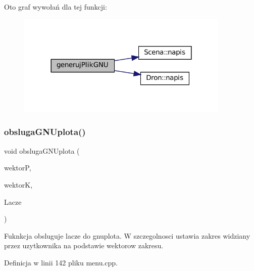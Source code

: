 Oto graf wywołań dla tej funkcji\+:\nopagebreak
\begin{figure}[H]
\begin{center}
\leavevmode
\includegraphics[width=288pt]{menu_8hh_a924b8ff013a18f0f1f0fdbdda6538e07_cgraph}
\end{center}
\end{figure}
\mbox{\label{menu_8hh_a233cd71579a56ad0b2926d4c5217eaa1}} 
\subsubsection{\texorpdfstring{obslugaGNUplota()}{obslugaGNUplota()}}
{\footnotesize\ttfamily void obsluga\+G\+N\+Uplota (\begin{DoxyParamCaption}\item[{const \mbox{\hyperlink{class_wektor3_d}{Wektor3D}} \&}]{wektorP,  }\item[{const \mbox{\hyperlink{class_wektor3_d}{Wektor3D}} \&}]{wektorK,  }\item[{\mbox{\hyperlink{class_pz_g_1_1_lacze_do_g_n_u_plota}{Pz\+G\+::\+Lacze\+Do\+G\+N\+U\+Plota}}}]{Lacze }\end{DoxyParamCaption})}

Fuknkcja obsluguje lacze do gnuplota. W szczegolnosci ustawia zakres widziany przez uzytkownika na podstawie wektorow zakresu. 

Definicja w linii 142 pliku menu.\+cpp.

